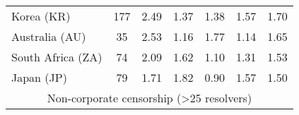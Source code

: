 \begin{table}[h!]
{\begin{tabular}{lcccccc}
Korea (KR) & \color{black} 177 & {\cellcolor[HTML]{6CAED6}} \color[HTML]{F1F1F1} \color{black} 2.49 & {\cellcolor[HTML]{F7FBFF}} \color[HTML]{000000} \color{black} 1.37 & {\cellcolor[HTML]{F6FAFF}} \color[HTML]{000000} \color{black} 1.38 & {\cellcolor[HTML]{E5EFF9}} \color[HTML]{000000} \color{black} 1.57 & \color{black} 1.70 \\
Australia (AU) & \color{black} 35 & {\cellcolor[HTML]{6CAED6}} \color[HTML]{F1F1F1} \color{black} 2.53 & {\cellcolor[HTML]{F5FAFE}} \color[HTML]{000000} \color{black} 1.16 & {\cellcolor[HTML]{CBDEF1}} \color[HTML]{000000} \color{black} 1.77 & {\cellcolor[HTML]{F7FBFF}} \color[HTML]{000000} \color{black} 1.14 & \color{black} 1.65 \\
South Africa (ZA) & \color{black} 74 & {\cellcolor[HTML]{6CAED6}} \color[HTML]{F1F1F1} \color{black} 2.09 & {\cellcolor[HTML]{C2D9EE}} \color[HTML]{000000} \color{black} 1.62 & {\cellcolor[HTML]{F7FBFF}} \color[HTML]{000000} \color{black} 1.10 & {\cellcolor[HTML]{E3EEF8}} \color[HTML]{000000} \color{black} 1.31 & \color{black} 1.53 \\
Japan (JP) & \color{black} 79 & {\cellcolor[HTML]{84BCDB}} \color[HTML]{000000} \color{black} 1.71 & {\cellcolor[HTML]{6CAED6}} \color[HTML]{F1F1F1} \color{black} 1.82 & {\cellcolor[HTML]{F7FBFF}} \color[HTML]{000000} \color{black} 0.90 & {\cellcolor[HTML]{A1CBE2}} \color[HTML]{000000} \color{black} 1.57 & \color{black} 1.50 \\

    \midrule
    \multicolumn{7}{c}{Non-corporate censorship (>25 resolvers)}\\
    \midrule


\end{tabular}}
\end{table}
